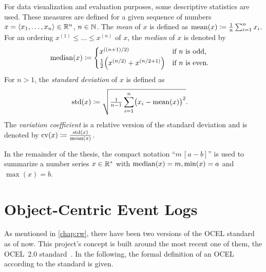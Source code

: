 \begin{outline}
\0 For data visualization and evaluation purposes, some descriptive statistics are used. These measures are defined for a given sequence of numbers
$x = \left< x_1,\dots,x_n \right>\in\mathbb{R}^n$, $n\in\mathbb{N}$.
  \1 The \textit{mean} of $x$ is defined as
  $\operatorname{mean}(x)\coloneqq\frac{1}{n} \sum_{i=1}^n x_i$.
  \1 For an ordering $x^{(1)} \leq\dots\leq x^{(n)}$ of $x$, the \textit{median} of $x$ is denoted by
  \begin{align*}
    \operatorname{median}(x) &\coloneqq \begin{cases}
      x^{((n+1)/2)} & \text{if $n$ is odd}, \\
      \frac{1}{2} \Bigl(
        x^{(n/2)} + x^{(n/2+1)}
      \Bigr) & \text{if $n$ is even}.
    \end{cases}
  \end{align*}
  \1 For $n>1$, the \textit{standard deviation} of $x$ is defined as
  \begin{align*}
    \operatorname{std}(x) &\coloneqq \sqrt{
      \tfrac{1}{n-1} \sum_{i=1}^n \bigl(x_i - \operatorname{mean}(x)\bigr)^2
    }.
  \end{align*}
  The \textit{variation coefficient} is a relative version of the standard deviation and is denoted by
  $\operatorname{cv}(x)\coloneqq\frac{\operatorname{std}(x)}{\operatorname{mean}(x)}$.

\0 In the remainder of the thesis, the compact notation ``$m\,[a - b]$'' is used to summarize a number series $x\in\mathbb{R}^*$ with $\operatorname{median}(x)=m,\min(x)=a$ and $\max(x)=b$.
\end{outline}

\section{Object-Centric Event Logs}
\label{sec:prelim-ocel}

As mentioned in \autoref{chap:rw}, there have been two versions of the OCEL standard as of now.
This project's concept is built around the most recent one of them, the OCEL~2.0 standard~\cite{OCEL2}.
In the following, the formal definition of an OCEL according to the standard is given.

